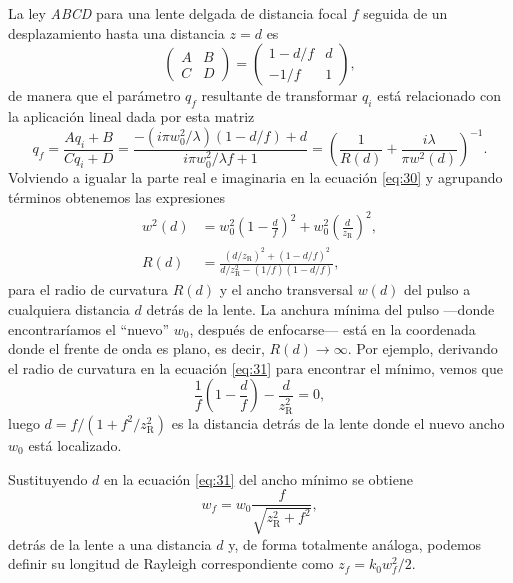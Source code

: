 \documentclass{scrartcl} %
\begin{document}
La ley \emph{ABCD} para una lente delgada de distancia focal $f$ seguida de un desplazamiento hasta una distancia $z=d$ es
\begin{equation}\label{eq:29}
  \begin{pmatrix}
   A & B \\
   C & D
  \end{pmatrix} 
  =
  \begin{pmatrix}
   1 - d/f & d \\
    -1/f & 1
  \end{pmatrix},
\end{equation}
de manera que el parámetro $q_{f}$ resultante de transformar $q_{i}$ está relacionado con la aplicación lineal dada por esta matriz
\begin{equation}\label{eq:30}
  q_{f} = \frac{Aq_{i}+B}{Cq_{i}+D} = \frac{-(i \pi w^{2}_{0}/\lambda)(1 - d/f) + d}{i \pi w^{2}_{0}/\lambda f + 1} = \left(\frac{1}{R(d)} + \frac{i \lambda}{\pi w^{2}(d)}\right)^{-1}.
\end{equation}
Volviendo a igualar la parte real e imaginaria en la ecuación \eqref{eq:30} y agrupando términos obtenemos las expresiones
\begin{align}
  w^{2}(d) & = w^{2}_{0}\left(1 - \frac{d}{f}\right)^{2} + w^{2}_{0}\left(\frac{d}{z_{\mathrm{R}}}\right)^{2}, \label{eq:31} \\
  R(d) & = \frac{(d/z_{\mathrm{R}})^{2} + (1-d/f)^{2}}{d/z^{2}_{\mathrm{R}} - (1/f)(1-d/f)}, \label{eq:32}
\end{align}
para el radio de curvatura $R(d)$ y el ancho transversal $w(d)$ del pulso a cualquiera distancia $d$ detrás de la lente. La anchura mínima del pulso ---donde encontraríamos el \enquote{nuevo} $w_{0}$, después de enfocarse--- está en la coordenada donde el frente de onda es plano, es decir, $R(d) \rightarrow \infty$. Por ejemplo, derivando el radio de curvatura en la ecuación \eqref{eq:31} para encontrar el mínimo, vemos que
\begin{equation}\label{eq:33}
  \frac{1}{f}\left(1-\frac{d}{f}\right) - \frac{d}{z^{2}_{\mathrm{R}}} = 0,
\end{equation}
luego $d = f/(1 + f^{2}/z^{2}_{\mathrm{R}})$ es la distancia detrás de la lente donde el nuevo ancho $w_{0}$ está localizado.

Sustituyendo $d$ en la ecuación \eqref{eq:31} del ancho mínimo se obtiene
\begin{equation}\label{eq:34}
  w_{f} = w_{0}\frac{f}{\sqrt{z^{2}_{\mathrm{R}} + f^{2}}},
\end{equation}
detrás de la lente a una distancia $d$ y, de forma totalmente análoga, podemos definir su longitud de Rayleigh correspondiente como $z_{f} = k_{0}w^{2}_{f}/2$.
\end{document}
